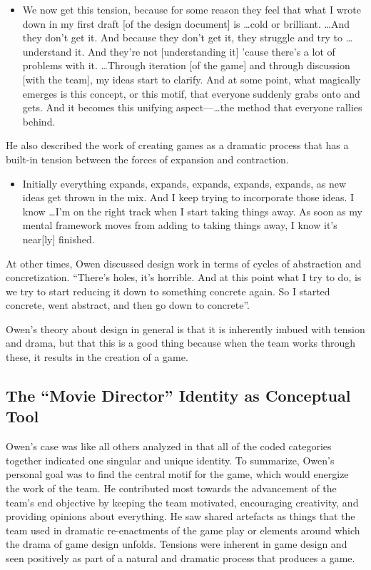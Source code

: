 \documentclass{chi2009}
\begin{document}
\begin{itemize}
\item [] We now get this tension, because for some reason they feel that what I wrote down in my first draft [of the design document] is \ldots cold or brilliant. \ldots And they don't get it. And because they don't get it, they struggle and try to \ldots understand it. And they're not [understanding it] 'cause there's a lot of problems with it. \dots Through iteration [of the game] and through discussion [with the team], my ideas start to clarify. And at some point, what magically emerges is this concept, or this motif, that everyone suddenly grabs onto and gets. And it becomes this unifying aspect---\ldots the method that everyone rallies behind. 
\end{itemize}

He also described the work of creating games as a dramatic process that has a built-in tension between the forces of expansion and contraction. 

\begin{itemize}
\item [] Initially everything expands, expands, expands, expands, expands, as new ideas get thrown in the mix. And I keep trying to incorporate those ideas. I know \dots I'm on the right track when I start taking things away. As soon as my mental framework moves from adding to taking things away, I know it's near[ly] finished. 
\end{itemize}

At other times, Owen discussed design work in terms of cycles of abstraction and concretization. ``There's holes, it's horrible. And at this point what I try to do, is we try to start reducing it down to something concrete again. So I started concrete, went abstract, and then go down to concrete''.

Owen's theory about design in general is that it is inherently imbued with tension and drama, but that this is a good thing because when the team works through these, it results in the creation of a game.  

\subsection{The ``Movie Director'' Identity as Conceptual Tool}

Owen's case was like all others analyzed in that all of the coded categories together indicated one singular and unique identity. To summarize, Owen's personal goal was to find the central motif for the game, which would energize the work of the team. He contributed most towards the advancement of the team's end objective by keeping the team motivated, encouraging creativity, and providing opinions about everything. He saw shared artefacts as things that the team used in dramatic re-enactments of the game play or elements around which the drama of game design unfolds.  Tensions were inherent in game design and seen positively as part of a natural and dramatic process that produces a game.
\end{document}
